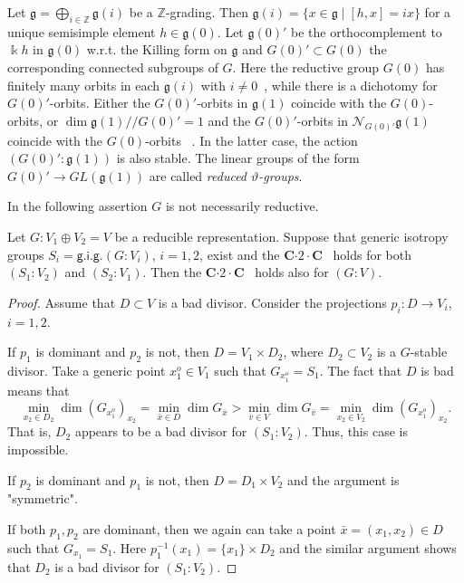 \begin{ex}  \label{theta-2}
Let ${{\mathfrak g}}=\bigoplus_{i\in{{\mathbb Z}}}{{\mathfrak g}}(i)$ be a ${{\mathbb Z}}$-grading. Then ${{\mathfrak g}}(i)=\{x\in{{\mathfrak g}} \mid [h,x]=ix\}$ for a unique
semisimple element $h\in{{\mathfrak g}}(0)$. Let ${{\mathfrak g}}(0)'$ be the orthocomplement to ${\Bbbk} h$ in ${{\mathfrak g}}(0)$ w.r.t. the Killing 
form on ${{\mathfrak g}}$ and  $G(0)'\subset G(0)$ the corresponding connected subgroups of $G$. 
Here the reductive group $G(0)$ has finitely many orbits in each ${{\mathfrak g}}(i)$ with $i\ne 0$~\cite{vi76}, while there is a 
dichotomy for $G(0)'$-orbits. Either the $G(0)'$-orbits in ${{\mathfrak g}}(1)$ coincide with the $G(0)$-orbits, or
$\dim{{\mathfrak g}}(1){/\!\!/} G(0)'=1$ and the $G(0)'$-orbits in ${{\mathcal N}}_{G(0)'}{{\mathfrak g}}(1)$ coincide with the $G(0)$-orbits~ \cite[Theorem\,2.9]{dG-V-Y}. In the latter case, the action $(G(0)':{{\mathfrak g}}(1))$ is also stable. The linear groups of the form 
$G(0)'\to GL({{\mathfrak g}}(1))$ are called {\it reduced $\vartheta$-groups}.
\end{ex}

In the following assertion $G$ is not necessarily reductive.
\begin{thm}  \label{thm:kosik1}
Let $G:V_1\oplus V_2=V$ be a reducible representation. Suppose that generic isotropy groups
$S_i={\mathsf{g.i.g.}}(G:V_i)$, $i=1,2$, exist and the {\textsf{\bfseries C${\cdot}2{\cdot}$C}\ } holds for both $(S_1:V_2)$ and $(S_2:V_1)$. 
Then the {\textsf{\bfseries C${\cdot}2{\cdot}$C}\ } holds also for $(G:V)$.
\end{thm}
\begin{proof}
Assume that $D\subset V$ is a bad divisor. Consider the 
projections $p_i: D\to V_i$, {$i=1,2$}. 

\textbullet\quad If $p_1$ is dominant and $p_2$ is not, then $D=V_1\times D_2$, where $D_2\subset V_2$ is a $G$-stable divisor. Take a generic point $x_1^o\in V_1$ such that $G_{x_1^o}= S_1$. The fact that 
$D$ is bad means that 
\[
   \min_{x_2\in D_2}\dim(G_{x_1^o})_{x_2}=\min_{\bar x\in D} \dim G_{\bar x}>\min_{\bar v\in V} \dim G_{\bar v}=\min_{x_2\in V_2}\dim(G_{x_1^o})_{x_2} .
\]
That is, $D_2$ appears to be a bad divisor for $(S_1: V_2)$. Thus, this case is impossible.

\textbullet\quad If $p_2$ is dominant and $p_1$ is not, then $D=D_1\times V_2$ and the argument is
"symmetric".

\textbullet\quad If both $p_1,p_2$ are dominant, then we again can take a point $\bar x=(x_1,x_2)\in D$
such that $G_{x_1}=S_1$. Here $p_1^{-1}(x_1)=\{x_1\}\times D_2$ and the similar argument shows that
$D_2$ is a bad divisor for $(S_1:V_2)$.
\end{proof}

